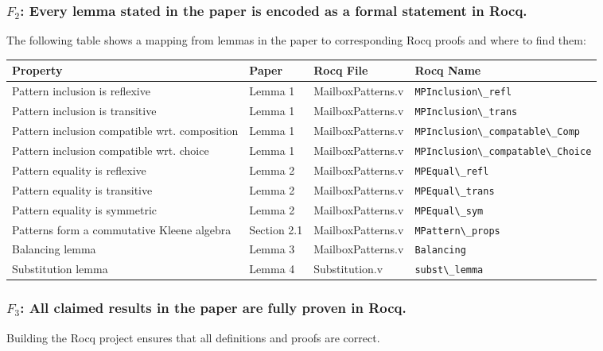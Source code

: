 \subsubsection{$F_2$: Every lemma stated in the paper is encoded as a formal statement in Rocq.}
The following table shows a mapping from lemmas in the paper to corresponding Rocq proofs and where to find them:

\begin{tabularx}{\textwidth}{|L|l|l|l|}
\hline
    \textbf{Property} & \textbf{Paper} & \textbf{Rocq File} & \textbf{Rocq Name} \\ \hline
    Pattern inclusion is reflexive & Lemma 1 & MailboxPatterns.v & \lstinline|MPInclusion\_refl| \\ \hline
    Pattern inclusion is transitive & Lemma 1 & MailboxPatterns.v & \lstinline|MPInclusion\_trans| \\ \hline
    Pattern inclusion compatible wrt. composition & Lemma 1 & MailboxPatterns.v & \lstinline|MPInclusion\_compatable\_Comp| \\ \hline
    Pattern inclusion compatible wrt. choice & Lemma 1 & MailboxPatterns.v & \lstinline|MPInclusion\_compatable\_Choice| \\ \hline
    Pattern equality is reflexive & Lemma 2 & MailboxPatterns.v & \lstinline|MPEqual\_refl| \\ \hline
    Pattern equality is transitive & Lemma 2 & MailboxPatterns.v & \lstinline|MPEqual\_trans| \\ \hline
    Pattern equality is symmetric & Lemma 2 & MailboxPatterns.v & \lstinline|MPEqual\_sym| \\ \hline
    Patterns form a commutative Kleene algebra & Section 2.1 & MailboxPatterns.v & \lstinline|MPattern\_props| \\ \hline
    Balancing lemma & Lemma 3 & MailboxPatterns.v & \lstinline|Balancing| \\ \hline
    Substitution lemma & Lemma 4 & Substitution.v & \lstinline|subst\_lemma| \\ \hline
\end{tabularx}

\subsubsection{$F_3$: All claimed results in the paper are fully proven in Rocq.}
Building the Rocq project ensures that all definitions and proofs are correct.

